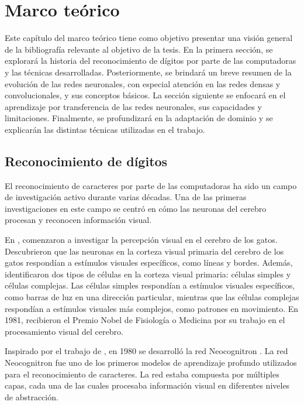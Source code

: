 \chapter{Marco teórico}
\label{Chapter2}

Este capítulo del marco teórico tiene como objetivo presentar una visión general de la bibliografía relevante al
objetivo de la tesis. En la primera sección, se explorará la historia del reconocimiento de dígitos por parte de las
computadoras y las técnicas desarrolladas. Posteriormente, se brindará un breve resumen de la evolución de las redes
neuronales, con especial atención en las redes densas y convolucionales, y sus conceptos básicos. La sección siguiente
se enfocará en el aprendizaje por transferencia de las redes neuronales, sus capacidades y limitaciones. Finalmente, se
profundizará en la adaptación de dominio y se explicarán las distintas técnicas utilizadas en el trabajo.

\section{Reconocimiento de dígitos}

El reconocimiento de caracteres por parte de las computadoras ha sido un campo de investigación activo durante varias
décadas. Una de las primeras investigaciones en este campo se centró en cómo las neuronas del cerebro procesan y
reconocen información visual.

En \citeyear{hubel1959receptive}, \citeauthor{hubel1959receptive} comenzaron a investigar la percepción visual en el
cerebro de los gatos. Descubrieron que las neuronas en la corteza visual primaria del cerebro de los gatos respondían a
estímulos visuales específicos, como líneas y bordes. Además, identificaron dos tipos de células en la corteza visual
primaria: células simples y células complejas. Las células simples respondían a estímulos visuales específicos, como
barras de luz en una dirección particular, mientras que las células complejas respondían a estímulos visuales más
complejos, como patrones en movimiento. En 1981, recibieron el Premio Nobel de Fisiología o Medicina por su trabajo en
el procesamiento visual del cerebro.

Inspirado por el trabajo de \citeauthor{hubel1959receptive}, en 1980 se desarrolló la red Neocognitron \parencite{fukushima1980neocognitron}. La red Neocognitron fue uno de los primeros modelos de aprendizaje profundo
utilizados para el reconocimiento de caracteres. La red estaba compuesta por múltiples capas, cada una de las cuales
procesaba información visual en diferentes niveles de abstracción.

